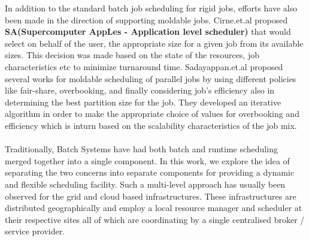 In addition to the standard batch job scheduling for rigid jobs, efforts have also been made in the direction of supporting moldable jobs. Cirne.et.al\cite{wcirne} proposed \textbf{SA(Supercomputer AppLes - Application level scheduler)} that would select on behalf of the user, the appropriate size for a given job from its available sizes. This decision was made based on the state of the resources, job characteristics etc to minimize turnaround time. Sadayappan.et.al\cite{sabin}\cite{srividya}\cite{sudha} proposed several works for moldable scheduling of parallel jobs by using different policies like fair-share, overbooking, and finally considering job's efficiency also in determining the best partition size for the job. They developed an iterative algorithm in order to make the appropriate choice of values for overbooking and efficiency which is inturn based on the scalability characteristics of the job mix.\\ \\
Traditionally, Batch Systems have had both batch and runtime scheduling merged together into a single component. In this work, we explore the idea of separating the two concerns into separate components for providing a dynamic and flexible scheduling facility. Such a multi-level approach has usually been observed for the grid and cloud based infrastructures. These infrastructures are distributed geographically and employ a local resource manager and scheduler at their respective sites all of which are coordinating by a single centralised broker / service provider.
